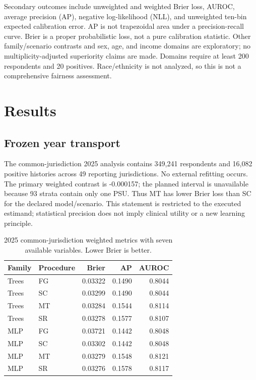 \documentclass[conference,letterpaper]{IEEEtran}
\begin{document}
Secondary outcomes include unweighted and weighted Brier loss, AUROC, average precision (AP), negative log-likelihood (NLL), and unweighted ten-bin expected calibration error. AP is not trapezoidal area under a precision-recall curve. Brier is a proper probabilistic loss, not a pure calibration statistic. Other family/scenario contrasts and sex, age, and income domains are exploratory; no multiplicity-adjusted superiority claims are made. Domains require at least 200 respondents and 20 positives. Race/ethnicity is not analyzed, so this is not a comprehensive fairness assessment.

\section{Results}
\subsection{Frozen year transport}
The common-jurisdiction 2025 analysis contains 349,241 respondents and 16,082 positive histories across 49 reporting jurisdictions. No external refitting occurs. The primary weighted contrast is -0.000157; the planned interval is unavailable because 93 strata contain only one PSU. Thus MT has lower Brier loss than SC for the declared model/scenario. This statement is restricted to the executed estimand; statistical precision does not imply clinical utility or a new learning principle.

\begin{table}[t]\caption{2025 common-jurisdiction weighted metrics with seven available variables. Lower Brier is better.}\label{tab:primary}\centering\small
\begin{tabular}{llrrr}\toprule Family & Procedure & Brier & AP & AUROC\\\midrule
Trees & FG & 0.03322 & 0.1490 & 0.8044\\
Trees & SC & 0.03299 & 0.1490 & 0.8044\\
Trees & MT & 0.03284 & 0.1544 & 0.8114\\
Trees & SR & 0.03278 & 0.1577 & 0.8107\\
MLP & FG & 0.03721 & 0.1442 & 0.8048\\
MLP & SC & 0.03302 & 0.1442 & 0.8048\\
MLP & MT & 0.03279 & 0.1548 & 0.8121\\
MLP & SR & 0.03276 & 0.1578 & 0.8117\\
\bottomrule\end{tabular}\end{table}
\end{document}
